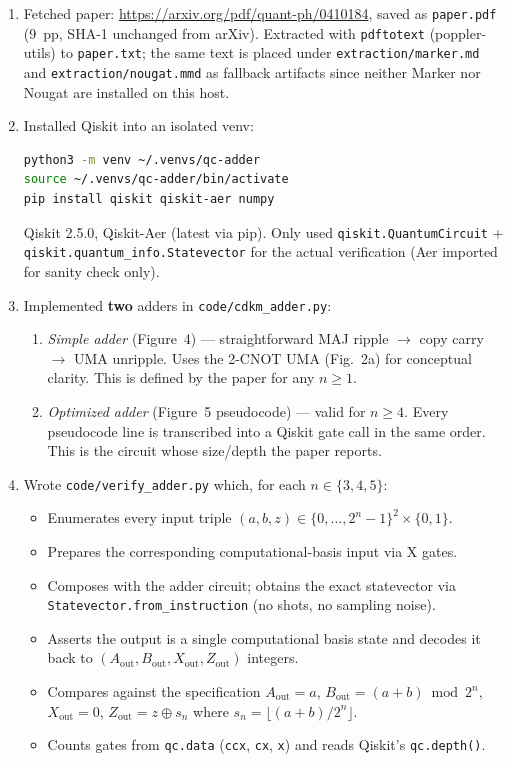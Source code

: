 \documentclass[11pt]{article}
\begin{document}
\begin{enumerate}
\item Fetched paper: \url{https://arxiv.org/pdf/quant-ph/0410184}, saved as \texttt{paper.pdf}
      (9~pp, SHA-1 unchanged from arXiv). Extracted with \texttt{pdftotext}
      (poppler-utils) to \texttt{paper.txt}; the same text is placed under
      \texttt{extraction/marker.md} and \texttt{extraction/nougat.mmd} as fallback
      artifacts since neither Marker nor Nougat are installed on this host.
\item Installed Qiskit into an isolated venv:
\begin{lstlisting}[language=bash]
python3 -m venv ~/.venvs/qc-adder
source ~/.venvs/qc-adder/bin/activate
pip install qiskit qiskit-aer numpy
\end{lstlisting}
Qiskit 2.5.0, Qiskit-Aer (latest via pip). Only used
\texttt{qiskit.QuantumCircuit} + \texttt{qiskit.quantum\_info.Statevector} for
the actual verification (Aer imported for sanity check only).

\item Implemented \textbf{two} adders in \texttt{code/cdkm\_adder.py}:
  \begin{enumerate}
    \item \emph{Simple adder} (Figure~4) --- straightforward MAJ ripple $\to$
          copy carry $\to$ UMA unripple. Uses the 2-CNOT UMA (Fig.~2a) for
          conceptual clarity. This is defined by the paper for any $n \ge 1$.
    \item \emph{Optimized adder} (Figure~5 pseudocode) --- valid for $n \ge 4$.
          Every pseudocode line is transcribed into a Qiskit gate call in the
          same order. This is the circuit whose size/depth the paper reports.
  \end{enumerate}

\item Wrote \texttt{code/verify\_adder.py} which, for each $n \in \{3,4,5\}$:
  \begin{itemize}
    \item Enumerates every input triple $(a,b,z) \in \{0,\dots,2^n{-}1\}^2 \times \{0,1\}$.
    \item Prepares the corresponding computational-basis input via X gates.
    \item Composes with the adder circuit; obtains the exact statevector via
          \texttt{Statevector.from\_instruction} (no shots, no sampling noise).
    \item Asserts the output is a single computational basis state and decodes
          it back to $(A_{\text{out}}, B_{\text{out}}, X_{\text{out}}, Z_{\text{out}})$
          integers.
    \item Compares against the specification
          $A_{\text{out}} = a$,
          $B_{\text{out}} = (a{+}b) \bmod 2^n$,
          $X_{\text{out}} = 0$,
          $Z_{\text{out}} = z \oplus s_n$ where $s_n = \lfloor(a{+}b)/2^n\rfloor$.
    \item Counts gates from \texttt{qc.data} (\texttt{ccx}, \texttt{cx}, \texttt{x})
          and reads Qiskit's \texttt{qc.depth()}.
  \end{itemize}


\end{enumerate}
\end{document}
